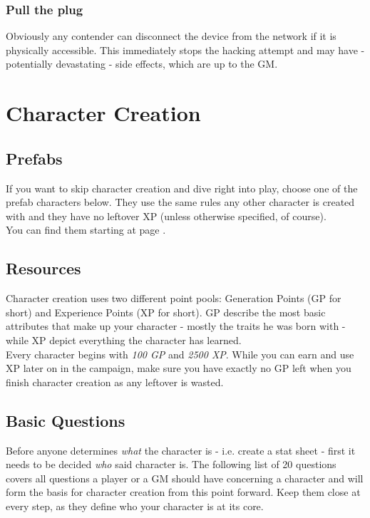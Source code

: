 \documentclass[12pt,a4paper,openany,usenames,dvipsnames]{book}
\begin{document}
	\subsection*{Pull the plug}
	Obviously any contender can disconnect the device from the network if it is physically accessible. This immediately stops the hacking attempt and may have - potentially devastating - side effects, which are up to the GM.

	\chapter{Character Creation}
	\section{Prefabs}
	If you want to skip character creation and dive right into play, choose one of the prefab characters below.
	They use the same rules any other character is created with
		and they have no leftover XP (unless otherwise specified, of course).
	\\
	You can find them starting at page \pageref{sec:pfchars}.

	\section{Resources}
	\label{sec:ccResources}
	Character creation uses two different point pools:
		Generation Points (GP for short) and Experience Points (XP for short).
	GP describe the most basic attributes that make up your character - mostly the traits he was born with - while XP depict everything the character has learned.\\
	Every character begins with \emph{100 GP} and \emph{2500 XP}. While you can earn and use XP later on in the campaign, make sure you have exactly no GP left when you finish character creation as any leftover is wasted.

	\section{Basic Questions}
	Before anyone determines \emph{what} the character is - i.e. create a stat sheet - first it needs to be decided \emph{who} said character is. The following list of 20 questions covers all questions a player or a GM should have concerning a character and will form the basis for character creation from this point forward. Keep them close at every step, as they define who your character is at its core.
\end{document}
